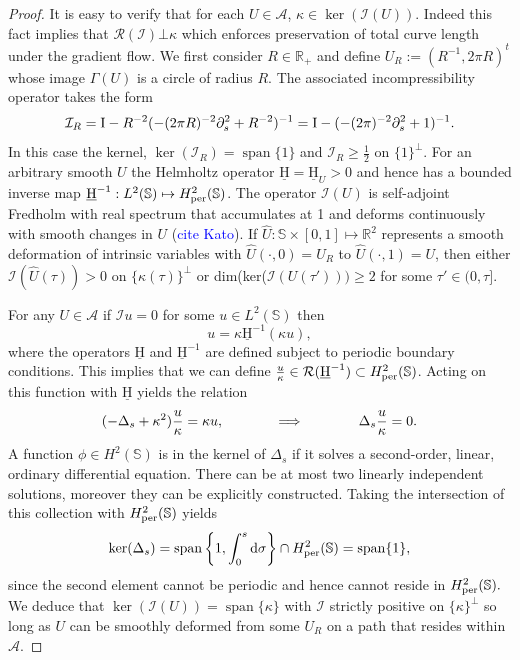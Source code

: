 \documentclass[11pt]{amsart}
\theoremstyle{plain}
\def\cA{{\mathcal A}}
\def\cI{{\mathcal I}}
\def\cR{{\mathcal R}}
\def\mbbR{\mathbb{R}}
\def\mbbS{\mathbb{S}}
\def\mrH{\textrm H}
\def\mrI{\textrm I}
\def\mrH{\underline{\mathrm{H}}}
\DeclareMathOperator{\Span}{span}
\def\rmd{\mathrm d}
\newcommand{\tcb}[1]{\textcolor{blue}{#1}}
\numberwithin{equation}{section}
\theoremstyle{plain}
\begin{document}
\begin{proof}
It is easy to verify that for each $U\in\cA$,  $\kappa\in\ker(\cI(U))$. Indeed this fact implies that $\cR(\cI)\bot\kappa$ which enforces preservation of total curve length under the gradient flow.   We first consider $R\in\mbbR_+$ and define  $U_R:=(R^{-1},2\pi R)^t$ whose image $\Gamma(U)$ is a circle of radius $R$. The associated incompressibility operator takes the form
$$ \cI_R=\mrI - R^{-2}(-(2\pi R)^{-2}\partial_s^2+R^{-2})^{-1}= \mrI -(-(2\pi)^{-2}\partial_s^2+1)^{-1}.$$
In this case the kernel, $\ker(\cI_R)=\Span\{1\}$ and $\cI_R\geq \frac12$ on $\{1\}^\bot.$ For an arbitrary smooth $U$ the Helmholtz operator $\mrH=\mrH_U>0$ and hence has a bounded inverse map $\mrH^{-1}: L^2(\mbbS)\mapsto H^2_{\rm per}(\mbbS)$. The  operator $\cI(U)$ is self-adjoint Fredholm with real spectrum that accumulates at 1 and deforms continuously with smooth changes in $U$ (\tcb{cite Kato}).  If $\hat U:\mbbS\times[0,1]\mapsto\mbbR^2$ represents a smooth deformation of intrinsic variables with $\hat U(\cdot,0)=U_R$ to $\hat U(\cdot,1)=U$, then either  $\cI(\hat U(\tau))>0$ on 
$\{\kappa(\tau)\}^\bot$ or dim(ker($\cI(U(\tau')))\geq2$ for some $\tau'\in(0,\tau].$ 

For any $U\in\cA$ if $\cI u=0$ for some $u\in L^2(\mbbS)$ then 
$$ u=\kappa\mrH^{-1}(\kappa u),$$
where the operators $\mrH$ and $\mrH^{-1}$ are defined subject to periodic boundary conditions.  This implies that we can define $\frac{u}{\kappa}\in \cR(\mrH^{-1})\subset H^2_{\rm per}(\mbbS)$. Acting on this function with $\mrH$ yields the relation
$$%
(-\Delta_s+\kappa^2)\frac{u}{\kappa}=\kappa u, \hspace{0.5in}\implies \hspace{0.5in}
\Delta_s \frac{u}{\kappa}=0.
$$
A function $\phi\in H^2(\mbbS)$ is in the kernel of $\Delta_s$ if it solves a second-order, linear, ordinary differential equation. There can be at most two linearly independent solutions, moreover they can be explicitly constructed. Taking the  intersection of this collection with $H^2_{\rm per}(\mbbS)$ yields
$$\ker(\Delta_s)= \Span\left\{1,\int_0^s \rmd\sigma\right\}\cap H^2_{\rm per}(\mbbS)= \Span\{1\},$$
since the second element cannot be periodic and hence cannot reside in $H^2_{\rm per}(\mbbS).$
We deduce that $\ker(\cI(U))=\Span\{\kappa\}$ with $\cI$ strictly positive on $\{\kappa\}^\bot$ so long as $U$ can be smoothly deformed from some $U_R$ on a path that resides within $\cA.$
\end{proof}
\end{document}
